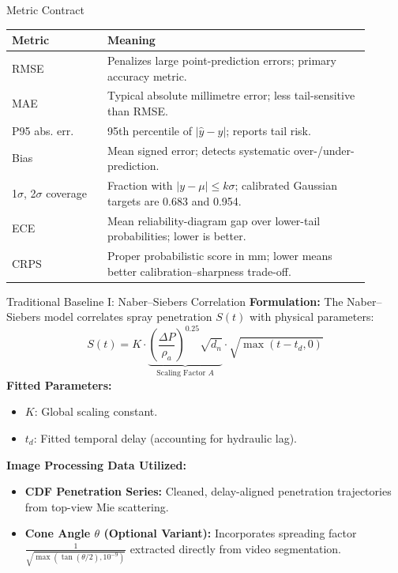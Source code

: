 \documentclass[UTF8,aspectratio=169]{ctexbeamer}
\begin{document}
\begin{frame}{Metric Contract}
\small
\begin{tabular}{L{0.24\linewidth}L{0.66\linewidth}}
\toprule
Metric & Meaning \\
\midrule
RMSE & Penalizes large point-prediction errors; primary accuracy metric. \\
MAE & Typical absolute millimetre error; less tail-sensitive than RMSE. \\
P95 abs. err. & 95th percentile of \(|\hat y-y|\); reports tail risk. \\
Bias & Mean signed error; detects systematic over-/under-prediction. \\
1\(\sigma\), 2\(\sigma\) coverage & Fraction with \(|y-\mu|\leq k\sigma\); calibrated Gaussian targets are 0.683 and 0.954. \\
ECE & Mean reliability-diagram gap over lower-tail probabilities; lower is better. \\
CRPS & Proper probabilistic score in mm; lower means better calibration--sharpness trade-off. \\
\bottomrule
\end{tabular}
\end{frame}

\begin{frame}{Traditional Baseline I: Naber--Siebers Correlation}
\textbf{Formulation:}
The Naber--Siebers model correlates spray penetration $S(t)$ with physical parameters:
\[
S(t) = K \cdot \underbrace{\left( \frac{\Delta P}{\rho_a} \right)^{0.25} \sqrt{d_n}}_{\text{Scaling Factor } A} \cdot \sqrt{\max(t - t_d, 0)}
\]
\vspace{0.2em}
\textbf{Fitted Parameters:}
\begin{itemize}
    \item $K$: Global scaling constant.
    \item $t_d$: Fitted temporal delay (accounting for hydraulic lag).
\end{itemize}
\vspace{0.2em}
\textbf{Image Processing Data Utilized:}
\begin{itemize}
    \item \textbf{CDF Penetration Series:} Cleaned, delay-aligned penetration trajectories from top-view Mie scattering.
    \item \textbf{Cone Angle $\theta$ (Optional Variant):} Incorporates spreading factor $\frac{1}{\sqrt{\max(\tan(\theta/2), 10^{-9})}}$ extracted directly from video segmentation.
\end{itemize}
\end{frame}
\end{document}

